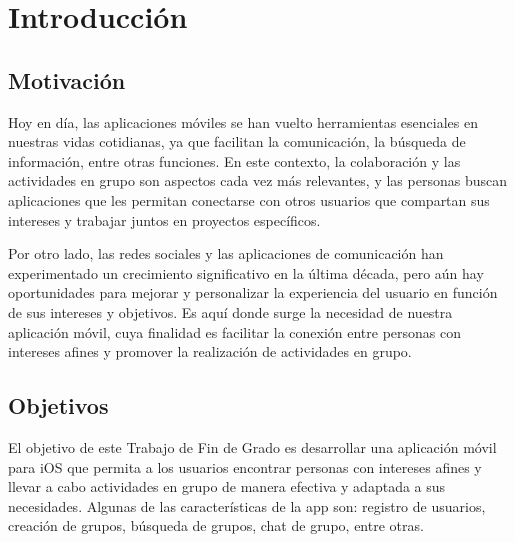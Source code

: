 \chapter{Introducción}
\section{Motivación}
Hoy en día, las aplicaciones móviles se han vuelto herramientas 
esenciales en nuestras vidas cotidianas, ya que facilitan la 
comunicación, la búsqueda de información, entre otras funciones. 
En este contexto, la colaboración y las actividades en grupo son 
aspectos cada vez más relevantes, y las personas buscan aplicaciones 
que les permitan conectarse con otros usuarios que compartan sus 
intereses y trabajar juntos en proyectos específicos.

Por otro lado, las redes sociales y las aplicaciones de comunicación 
han experimentado un crecimiento significativo en la última década, 
pero aún hay oportunidades para mejorar y personalizar la experiencia 
del usuario en función de sus intereses y objetivos. Es aquí donde 
surge la necesidad de nuestra aplicación móvil, cuya finalidad es 
facilitar la conexión entre personas con intereses afines y promover 
la realización de actividades en grupo.

\section{Objetivos}
El objetivo de este Trabajo de Fin de Grado es desarrollar una 
aplicación móvil para iOS que permita a los usuarios 
encontrar personas con intereses afines y llevar a cabo actividades 
en grupo de manera efectiva y adaptada a sus necesidades. Algunas 
de las características de la app son: registro de usuarios, creación 
de grupos, búsqueda de grupos, chat de grupo, entre otras.

\begin{comment}
Para satisfacer las necesidades de los usuarios, se ha diseñado una 
interfaz amigable y funcional que facilite la interacción y el uso de 
la aplicación.
\end{comment}
